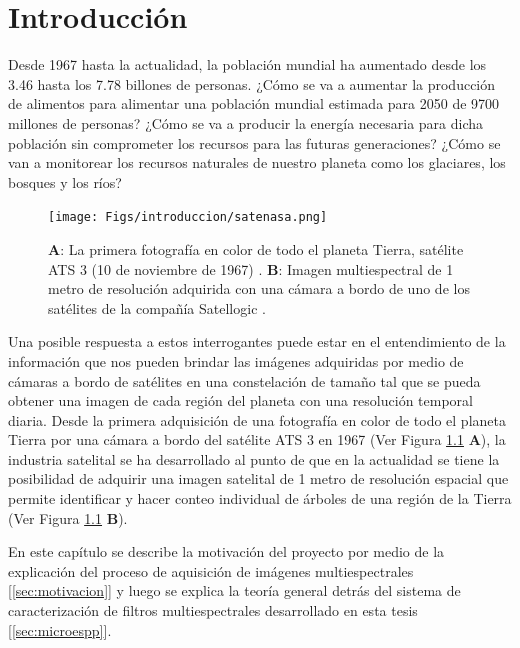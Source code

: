 \singlespacing
\chapter{Introducción}
\label{chap:introd}


\hspace{0.5cm}Desde 1967 hasta la actualidad, la población mundial ha aumentado desde los 3.46 hasta los 7.78 billones de personas. ¿Cómo se va a aumentar la producción de alimentos para alimentar una población mundial estimada para 2050 de 9700 millones de personas? ¿Cómo se va a producir la energía necesaria para dicha población sin comprometer los recursos para las futuras generaciones? ¿Cómo se van a monitorear los recursos naturales de nuestro planeta como los glaciares, los bosques y los ríos?

\begin{figure}[H]
\centering
\texttt{[image: Figs/introduccion/satenasa.png]}
\caption{\textbf{A}: La primera fotografía en color de todo el planeta Tierra, satélite ATS 3 (10 de noviembre de 1967)  \cite{nattierrra}. \textbf{B}: Imagen multiespectral de 1 metro de resolución adquirida con una cámara a bordo de uno de los satélites de la compañía Satellogic \cite{imsatt}.}
\label{figs:tierraysatell}
\end{figure}

Una posible respuesta a estos interrogantes puede estar en el entendimiento de la información que nos pueden brindar las imágenes adquiridas por medio de cámaras a bordo de satélites en una constelación de tamaño tal que se pueda obtener una imagen de cada región del planeta con una resolución temporal diaria. Desde la primera adquisición de una fotografía en color de todo el planeta Tierra por una cámara a bordo del satélite ATS 3 en 1967 (Ver Figura \ref{figs:tierraysatell} \textbf{A}), la industria satelital se ha desarrollado al punto de que en la actualidad se tiene la posibilidad de adquirir una imagen satelital de 1 metro de resolución espacial que permite identificar y hacer conteo individual de árboles de una región de la Tierra (Ver Figura \ref{figs:tierraysatell} \textbf{B}).

En este capítulo se describe la motivación del proyecto por medio de la explicación del proceso de aquisición de imágenes multiespectrales [\ref{sec:motivacion}] y luego se explica la teoría general detrás del sistema de caracterización de filtros multiespectrales desarrollado en esta tesis [\ref{sec:microespp}].

